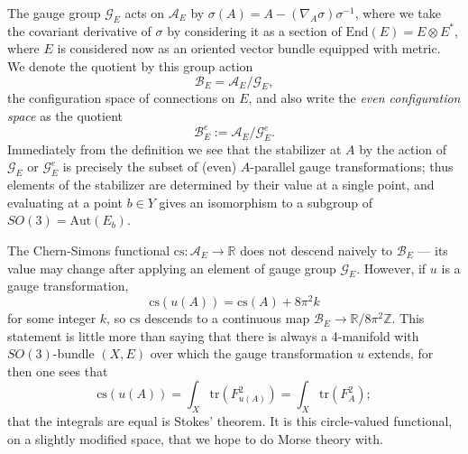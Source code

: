 \documentclass[10pt,a4paper]{amsart}
\theoremstyle{definition}
\theoremstyle{remark}
\numberwithin{figure}{qchap}
\begin{document}
The gauge group $\mathcal G_E$ acts on $\mathcal A_E$ by $\sigma(A) = A - (\nabla_A \sigma) \sigma^{-1}$, where we take the covariant derivative of $\sigma$ by considering it as a section of $\text{End}(E) = E \otimes E^*$, where $E$ is considered now as an oriented vector bundle equipped with metric. We denote the quotient by this group action $$\mathcal B_E = \mathcal A_E/\mathcal G_E,$$ the configuration space of connections on $E$, and also write the \textit{even configuration space} as the quotient $$\mathcal B^e_E := \mathcal A_E/\mathcal G^e_E.$$ Immediately from the definition we see that the stabilizer at $A$ by the action of $\mathcal G_E$ or $\mathcal G^e_E$ is precisely the subset of (even) $A$-parallel gauge transformations; thus elements of the stabilizer are determined by their value at a single point, and evaluating at a point $b \in Y$ gives an isomorphism to a subgroup of $SO(3) = \text{Aut}(E_b)$.

The Chern-Simons functional $\text{cs}: \mathcal A_E \to \mathbb R$ does not descend naively to $\mathcal B_E$ --- its value may change after applying an element of gauge group $\mathcal G_E$. However, if $u$ is a gauge transformation, $$\text{cs}(u(A)) = \text{cs}(A) + 8\pi^2 k$$ for some integer $k$, so $\text{cs}$ descends to a continuous map $\mathcal B_E \to \mathbb R/8\pi^2 \mathbb Z$. This statement is little more than saying that there is always a 4-manifold with $SO(3)$-bundle $(X,E)$ over which the gauge transformation $u$ extends, for then one sees that $$\text{cs}(u(A)) = \int_X \text{tr}\left(F_{u(A)}^2\right) = \int_X \text{tr}\left(F_A^2\right);$$ that the integrals are equal is Stokes' theorem. It is this circle-valued functional, on a slightly modified space, that we hope to do Morse theory with.
\end{document}
